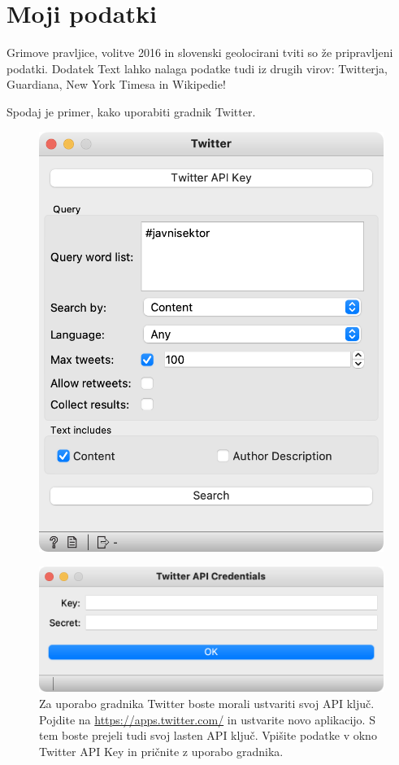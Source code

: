 \chapter{Moji podatki}
\label{ch:moji-podatki}

Grimove pravljice, volitve 2016 in slovenski geolocirani tviti so že pripravljeni podatki. Dodatek Text lahko nalaga podatke tudi iz drugih virov: Twitterja, Guardiana, New York Timesa in Wikipedie! 

Spodaj je primer, kako uporabiti gradnik Twitter.

\begin{figure}[h]
    \centering
    \includegraphics[width=0.65\linewidth]{twitter.png}%
    \caption{ }
    \label{fig:twitter}
\end{figure}

\begin{figure}[h]
    \centering
    \includegraphics[width=0.65\linewidth]{key-window.png}%
    \caption{Za uporabo gradnika Twitter boste morali ustvariti svoj API ključ. Pojdite na \url{https://apps.twitter.com/} in ustvarite novo aplikacijo. S tem boste prejeli tudi svoj lasten API ključ. Vpišite podatke v okno Twitter API Key in pričnite z uporabo gradnika.}
    \label{fig:twitter-key}
\end{figure}

